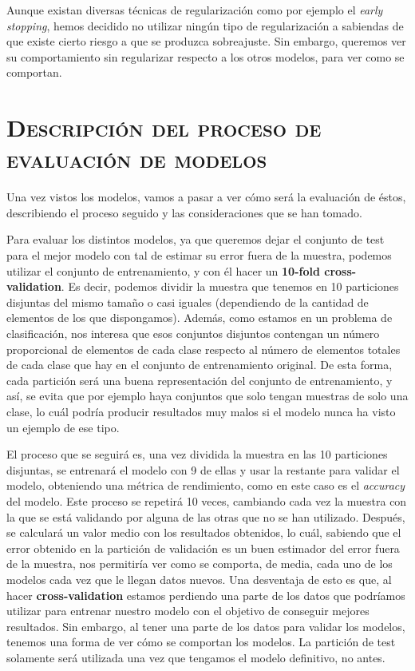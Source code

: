 \documentclass[11pt,a4paper]{article}
\begin{document}
Aunque existan diversas técnicas de regularización como por ejemplo el \textit{early stopping}, hemos decidido no utilizar ningún tipo de
regularización a sabiendas de que existe cierto riesgo a que se produzca sobreajuste. Sin embargo, queremos ver su comportamiento sin
regularizar respecto a los otros modelos, para ver como se comportan.

\section{\textsc{Descripción del proceso de evaluación de modelos}}

Una vez vistos los modelos, vamos a pasar a ver cómo será la evaluación de éstos, describiendo el proceso seguido y las consideraciones que
se han tomado.

Para evaluar los distintos modelos, ya que queremos dejar el conjunto de test para el mejor modelo con tal de estimar su error fuera de la
muestra, podemos utilizar el conjunto de entrenamiento, y con él hacer un \textbf{10-fold cross-validation}. Es decir, podemos dividir
la muestra que tenemos en 10 particiones disjuntas del mismo tamaño o casi iguales (dependiendo de la cantidad de elementos de los que
dispongamos). Además, como estamos en un problema de clasificación, nos interesa que esos conjuntos disjuntos contengan un número proporcional
de elementos de cada clase respecto al número de elementos totales de cada clase que hay en el conjunto de entrenamiento original. De esta
forma, cada partición será una buena representación del conjunto de entrenamiento, y así, se evita que por ejemplo haya conjuntos que solo
tengan muestras de solo una clase, lo cuál podría producir resultados muy malos si el modelo nunca ha visto un ejemplo de ese tipo.

El proceso que se seguirá es, una vez dividida la muestra en las 10 particiones disjuntas, se entrenará el modelo con 9 de ellas y
usar la restante para validar el modelo, obteniendo una métrica de rendimiento, como en este caso es el \textit{accuracy} del modelo.
Este proceso se repetirá 10 veces, cambiando cada vez la muestra con la que se está validando por alguna de las otras que no se han utilizado.
Después, se calculará un valor medio con los resultados obtenidos, lo cuál, sabiendo que el error obtenido en la partición de validación
es un buen estimador del error fuera de la muestra, nos permitiría ver como se comporta, de media, cada uno de los modelos cada vez que le
llegan datos nuevos. Una desventaja de esto es que, al hacer \textbf{cross-validation} estamos perdiendo una parte de los datos que podríamos
utilizar para entrenar nuestro modelo con el objetivo de conseguir mejores resultados. Sin embargo, al tener una parte de los datos para
validar los modelos, tenemos una forma de ver cómo se comportan los modelos. La partición de test solamente será utilizada una vez que tengamos
el modelo definitivo, no antes.
\end{document}
